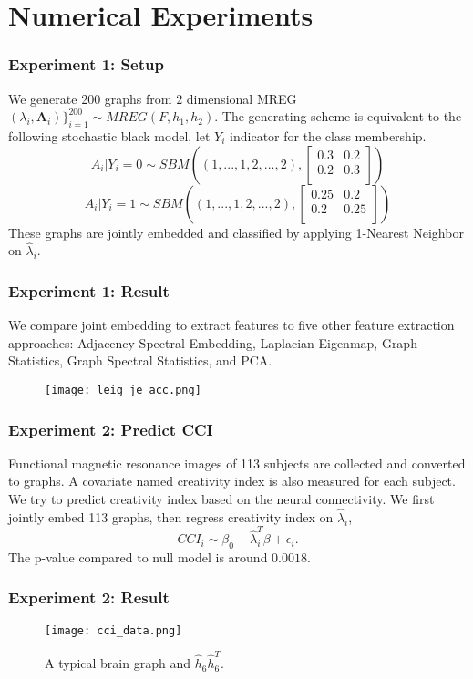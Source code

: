 \documentclass[]{beamer}
\newcommand{\bA}{\mathbf{A}}
\begin{document}
\section{Numerical Experiments}
\begin{frame}
\frametitle{Experiment 1: Setup}
We generate 200 graphs from $2$ dimensional MREG $(\lambda_i,\bA_i)\}_{i=1}^{200} \sim MREG(F,h_1,h_2)$. The generating scheme is equivalent to the following stochastic black model, let $Y_i$ indicator for the class membership.
\[ A_i|Y_i=0 \sim  SBM((1,...,1,2,...,2),\begin{bmatrix} 0.3 & 0.2 \\ 0.2 & 0.3 \\ \end{bmatrix})  \]
\[ A_i|Y_i=1 \sim  SBM((1,...,1,2,...,2),\begin{bmatrix} 0.25 & 0.2 \\ 0.2 & 0.25 \\ \end{bmatrix})\]
These graphs are jointly embedded and classified by applying 1-Nearest Neighbor on $\hat{\lambda}_{i}$. 
\end{frame}

\begin{frame}
\frametitle{Experiment 1: Result}
We compare joint embedding to extract features to five other feature extraction approaches: Adjacency Spectral Embedding, Laplacian Eigenmap, Graph Statistics, Graph Spectral Statistics, and PCA.
\begin{figure}[!htbp]
	\centering
	\texttt{[image: leig\_je\_acc.png]}
\end{figure} 

\end{frame}

\begin{frame}
\frametitle{Experiment 2: Predict CCI}
Functional magnetic resonance images of 113 subjects are collected and converted to graphs. A covariate named creativity index is also measured for each subject. We try to predict creativity index based on the neural connectivity. We first jointly embed 113 graphs, then regress creativity index on $\hat{\lambda}_{i}$,
\[CCI_i \sim \beta_0+\hat{\lambda}_i^T\beta + \epsilon_i. \]
The p-value compared to null model is around $0.0018$.
\end{frame}


\begin{frame}
	\frametitle{Experiment 2: Result}
	\begin{figure}[!htbp]
		\centering
		\texttt{[image: cci\_data.png]}
		\caption{A typical brain graph and $\hat{h}_6 \hat{h}_6^T$.}
	\end{figure}
\end{frame}
\end{document}
